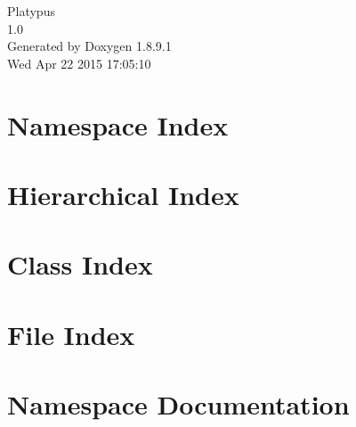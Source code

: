 \documentclass[twoside]{book}
\newcommand{\+}{\discretionary{\mbox{\scriptsize$\hookleftarrow$}}{}{}}
\newcommand{\clearemptydoublepage}{%
  \newpage{\pagestyle{empty}\cleardoublepage}%
}
\begin{document}
\begin{titlepage}
\vspace*{7cm}
\begin{center}%
{\Large Platypus \\[1ex]\large 1.\+0 }\\
\vspace*{1cm}
{\large Generated by Doxygen 1.8.9.1}\\
\vspace*{0.5cm}
{\small Wed Apr 22 2015 17:05:10}\\
\end{center}
\end{titlepage}
\clearemptydoublepage
\tableofcontents
\clearemptydoublepage
{}

\chapter{Namespace Index}

\chapter{Hierarchical Index}

\chapter{Class Index}

\chapter{File Index}

\chapter{Namespace Documentation}

























\end{document}

